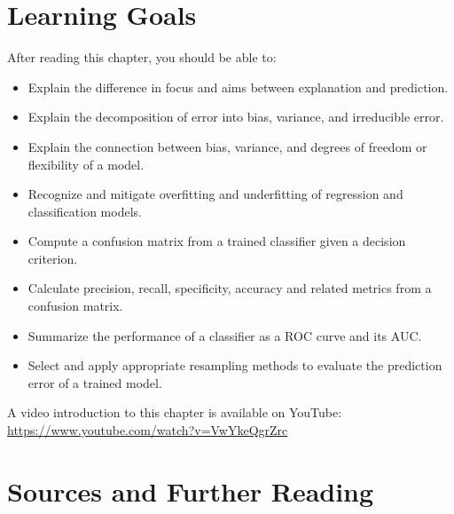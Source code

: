 %
%
\section*{Learning Goals}

After reading this chapter, you should be able to:
\begin{itemize}
   \item Explain the difference in focus and aims between explanation and prediction.
   \item Explain the decomposition of error into bias, variance, and irreducible error.
   \item Explain the connection between bias, variance, and degrees of freedom or flexibility of a model.
   \item Recognize and mitigate overfitting and underfitting of regression and classification models.
   \item Compute a confusion matrix from a trained classifier given a decision criterion.
   \item Calculate precision, recall, specificity, accuracy and related metrics from a confusion matrix.
   \item Summarize the performance of a classifier as a ROC curve and its AUC.
   \item Select and apply appropriate resampling methods to evaluate the prediction error of a trained model.
\end{itemize}

\begin{advanced}
\begin{videobox}
A video introduction to this chapter is available on YouTube:\\

\url{https://www.youtube.com/watch?v=VwYkeQgrZrc}
\end{videobox}
\end{advanced}

\section*{Sources and Further Reading}

